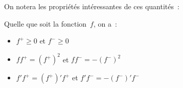 \documentclass[main.tex]{subfiles}
\begin{document}
On notera les propriétés intéressantes de ces quantités~:
\begin{prop}\label{prop:partie_neg_et_pos}
Quelle que soit la fonction~$f$, on a~:
\begin{itemize}
\item $f^+ \geq 0$ et $f^- \geq 0$
\item $ff^+=(f^+)^2$  et $ff^-=-(f^-)^2$ 
\item  $f'f^+=(f^+)'f^+$  et $f'f^-=-(f^-)'f^-$ 
\end{itemize} 
\end{prop}
\end{document}
